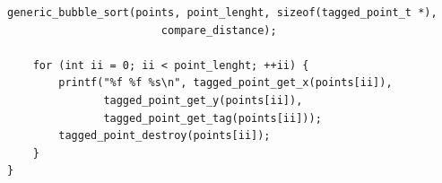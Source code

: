 \documentclass[a4paper]{article}
\begin{document}
\begin{exercises}
\begin{minipage}[H]{\linewidth}
\begin{lstlisting}[style=C,
caption={Solución al ejercicio 22 -- \texttt{main.c}},
label={lst:solution22}]
    generic_bubble_sort(points, point_lenght, sizeof(tagged_point_t *),
                        compare_distance);

    for (int ii = 0; ii < point_lenght; ++ii) {
        printf("%f %f %s\n", tagged_point_get_x(points[ii]),
               tagged_point_get_y(points[ii]),
               tagged_point_get_tag(points[ii]));
        tagged_point_destroy(points[ii]);
    }
}
\end{lstlisting}
\end{minipage}










\end{exercises}
\end{document}
